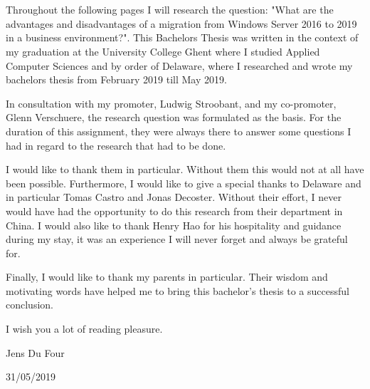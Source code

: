
\chapter*{}
\label{ch:voorwoord}

Throughout the following pages I will research the question: "What are the advantages and disadvantages of a migration from Windows Server 2016 to 2019 in a business environment?". This Bachelors Thesis was written in the context of my graduation at the University College Ghent where I studied Applied Computer Sciences and by order of Delaware, where I researched and wrote my bachelors thesis from February 2019 till May 2019.

In consultation with my promoter, Ludwig Stroobant, and my co-promoter, Glenn Verschuere, the research question was formulated as the basis. For the duration of this assignment, they were always there to answer some questions I had in regard to the research that had to be done. 

I would like to thank them in particular. Without them this would not at all have been possible.
Furthermore, I would like to give a special thanks to Delaware and in particular Tomas Castro and Jonas Decoster. Without their effort, I never would have had the opportunity to do this research from their department in China. I would also like to thank Henry Hao for his hospitality and guidance during my stay, it was an experience I will never forget and always be grateful for. 

Finally, I would like to thank my parents in particular. Their wisdom and motivating words have helped me to bring this bachelor's thesis to a successful conclusion.

I wish you a lot of reading pleasure.

Jens Du Four

31/05/2019